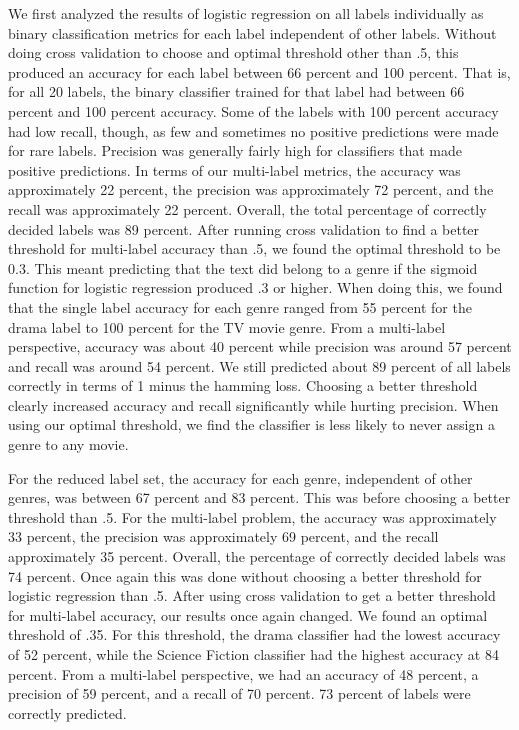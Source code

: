 \documentclass[sigconf]{acmart}
\begin{document}
We first analyzed the results of logistic regression on all labels individually as binary classification metrics for each label independent of other labels.  Without doing cross validation to choose and optimal threshold other than .5, this produced an accuracy for each label between 66 percent and 100 percent. That is, for all 20 labels, the binary classifier trained for that label had between 66 percent and 100 percent accuracy. Some of the labels with 100 percent accuracy had low recall, though, as few and sometimes no positive predictions were made for rare labels. Precision was generally fairly high for classifiers that made positive predictions. In terms of our multi-label metrics, the accuracy was approximately 22 percent, the precision was approximately 72 percent, and the recall was approximately 22 percent. Overall, the total percentage of correctly decided labels was 89 percent. After running cross validation to find a better threshold for multi-label accuracy than .5, we found the optimal threshold to be 0.3. This meant predicting that the text did belong to a genre if the sigmoid function for logistic regression produced .3 or higher. When doing this, we found that the single label accuracy for each genre ranged from 55 percent for the drama label to 100 percent for the TV movie genre. From a multi-label perspective, accuracy was about 40 percent while precision was around 57 percent and recall was around 54 percent.  We still predicted about 89 percent of all labels correctly in terms of 1 minus the hamming loss. Choosing a better threshold clearly increased accuracy and recall significantly while hurting precision. When using our optimal threshold, we find the classifier is less likely to never assign a genre to any movie.

For the reduced label set, the accuracy for each genre, independent of other genres, was between 67 percent and 83 percent. This was before choosing a better threshold than .5. For the multi-label problem, the accuracy was approximately 33 percent, the precision was approximately 69 percent, and the recall approximately 35 percent. Overall, the percentage of correctly decided labels was 74 percent. Once again this was done without choosing a better threshold for logistic regression than .5.  After using cross validation to get a better threshold for multi-label accuracy, our results once again changed. We found an optimal threshold of .35. For this threshold, the drama classifier had the lowest accuracy of 52 percent, while the Science Fiction classifier had the highest accuracy at 84 percent. From a multi-label perspective, we had an accuracy of 48 percent, a precision of 59 percent, and a recall of 70 percent.  73 percent of labels were correctly predicted. 
\end{document}
